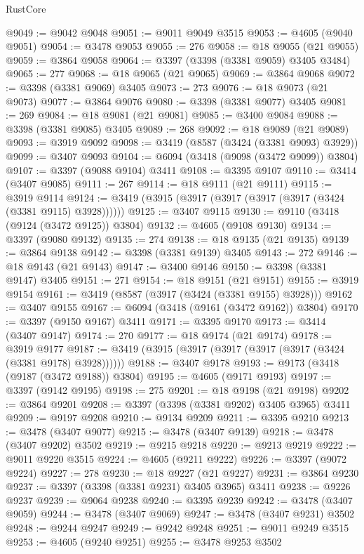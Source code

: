 \begin{lexlean}{RustCore}
\begin{coremodule}
@9049 := @9042 @9048
@9051 := @9011 @9049 @3515
@9053 := @4605 (@9040 @9051)
@9054 := @3478 @9053
@9055 := 276
@9058 := @18 @9055 (@21 @9055)
@9059 := @3864 @9058
@9064 := @3397 (@3398 (@3381 @9059) @3405 @3484)
@9065 := 277
@9068 := @18 @9065 (@21 @9065)
@9069 := @3864 @9068
@9072 := @3398 (@3381 @9069) @3405
@9073 := 273
@9076 := @18 @9073 (@21 @9073)
@9077 := @3864 @9076
@9080 := @3398 (@3381 @9077) @3405
@9081 := 269
@9084 := @18 @9081 (@21 @9081)
@9085 := @3400 @9084
@9088 := @3398 (@3381 @9085) @3405
@9089 := 268
@9092 := @18 @9089 (@21 @9089)
@9093 := @3919 @9092
@9098 := @3419 (@8587 (@3424 (@3381 @9093) @3929))
@9099 := @3407 @9093
@9104 := @6094 (@3418 (@9098 (@3472 @9099)) @3804)
@9107 := @3397 (@9088 @9104) @3411
@9108 := @3395 @9107
@9110 := @3414 (@3407 @9085)
@9111 := 267
@9114 := @18 @9111 (@21 @9111)
@9115 := @3919 @9114
@9124 := @3419 (@3915 (@3917 (@3917 (@3917 (@3917 (@3424 (@3381 @9115) @3928))))))
@9125 := @3407 @9115
@9130 := @9110 (@3418 (@9124 (@3472 @9125)) @3804)
@9132 := @4605 (@9108 @9130)
@9134 := @3397 (@9080 @9132)
@9135 := 274
@9138 := @18 @9135 (@21 @9135)
@9139 := @3864 @9138
@9142 := @3398 (@3381 @9139) @3405
@9143 := 272
@9146 := @18 @9143 (@21 @9143)
@9147 := @3400 @9146
@9150 := @3398 (@3381 @9147) @3405
@9151 := 271
@9154 := @18 @9151 (@21 @9151)
@9155 := @3919 @9154
@9161 := @3419 (@8587 (@3917 (@3424 (@3381 @9155) @3928)))
@9162 := @3407 @9155
@9167 := @6094 (@3418 (@9161 (@3472 @9162)) @3804)
@9170 := @3397 (@9150 @9167) @3411
@9171 := @3395 @9170
@9173 := @3414 (@3407 @9147)
@9174 := 270
@9177 := @18 @9174 (@21 @9174)
@9178 := @3919 @9177
@9187 := @3419 (@3915 (@3917 (@3917 (@3917 (@3917 (@3424 (@3381 @9178) @3928))))))
@9188 := @3407 @9178
@9193 := @9173 (@3418 (@9187 (@3472 @9188)) @3804)
@9195 := @4605 (@9171 @9193)
@9197 := @3397 (@9142 @9195)
@9198 := 275
@9201 := @18 @9198 (@21 @9198)
@9202 := @3864 @9201
@9208 := @3397 (@3398 (@3381 @9202) @3405 @3965) @3411
@9209 := @9197 @9208
@9210 := @9134 @9209
@9211 := @3395 @9210
@9213 := @3478 (@3407 @9077)
@9215 := @3478 (@3407 @9139)
@9218 := @3478 (@3407 @9202) @3502
@9219 := @9215 @9218
@9220 := @9213 @9219
@9222 := @9011 @9220 @3515
@9224 := @4605 (@9211 @9222)
@9226 := @3397 (@9072 @9224)
@9227 := 278
@9230 := @18 @9227 (@21 @9227)
@9231 := @3864 @9230
@9237 := @3397 (@3398 (@3381 @9231) @3405 @3965) @3411
@9238 := @9226 @9237
@9239 := @9064 @9238
@9240 := @3395 @9239
@9242 := @3478 (@3407 @9059)
@9244 := @3478 (@3407 @9069)
@9247 := @3478 (@3407 @9231) @3502
@9248 := @9244 @9247
@9249 := @9242 @9248
@9251 := @9011 @9249 @3515
@9253 := @4605 (@9240 @9251)
@9255 := @3478 @9253 @3502

\end{coremodule}
\end{lexlean}
